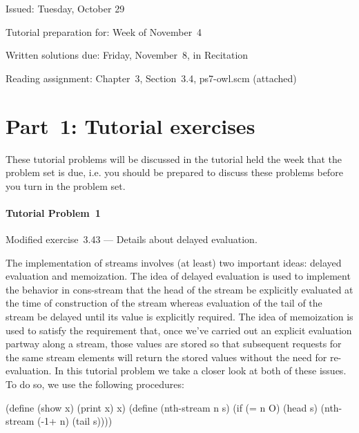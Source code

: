 
\def\fbox#1{%
  \vtop{\vbox{\hrule%
     \hbox{\vrule\kern3pt%
 \vtop{\vbox{\kern3pt#1}\kern3pt}%
 \kern3pt\vrule}}%
 \hrule}}




\noindent
Issued: Tuesday, October 29

\noindent
Tutorial preparation for:  Week of November~4

\noindent
Written solutions due: Friday, November~8, in Recitation

\noindent
Reading assignment: Chapter~3, Section~3.4, {\cf ps7-owl.scm} (attached)

\medskip

\section{Part~1: Tutorial exercises}

These tutorial problems will be discussed in the tutorial held the week
that the problem set is due, i.e. you should be prepared to discuss
these problems before you turn in the problem set.

\paragraph{Tutorial Problem~1} 
Modified exercise~3.43 --- Details about delayed evaluation.

The implementation of streams involves (at least) two important ideas:
delayed evaluation and memoization. The idea of delayed evaluation is used
to implement the behavior in {\cf cons-stream} that the
head of the stream be explicitly evaluated at the time of construction of the
stream whereas evaluation of the tail of the stream be delayed until its
value is explicitly required. The idea of memoization is used to satisfy the
requirement that, once we've carried out
an explicit evaluation partway along a stream, those values are stored so
that subsequent requests for the same stream elements will return the
stored values without the need for re-evaluation. In this tutorial problem we
take a closer look at both of these issues. To do so, we use the following
procedures:

\beginlisp 
(define (show x)
  (print x)
  x)
\null
(define (nth-stream n s)
  (if (= n O)
      (head s)
      (nth-stream (-1+ n) (tail s))))
\endlisp 

